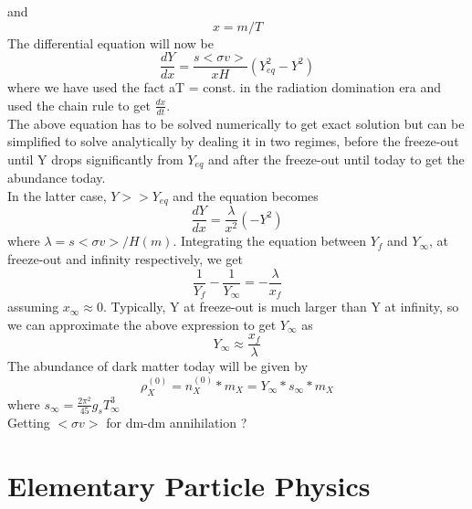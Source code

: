 \documentclass[12pt,a4paper,oneside]{book}
\begin{document}
and 
\begin{equation}
    x = m/T
\end{equation}
The differential equation will now be 
\begin{equation}
    \frac{dY}{dx} = \frac{s<\sigma v>}{xH}(Y_{eq}^2 - Y^2)
\end{equation}
where we have used the fact aT = const. in the radiation domination era and used the chain rule to get $\frac{dx}{dt}$.\\ The above equation has to be solved numerically to get exact solution but can be simplified to solve analytically by dealing it in two regimes, before the freeze-out until Y drops significantly from $Y_{eq}$ and after the freeze-out until today to get the abundance today.\\ In the latter case, $ Y >> Y_{eq}$ and the equation becomes
\begin{equation}
    \frac{dY}{dx}  = \frac{\lambda}{x^2}(- Y^2) 
\end{equation}
where $\lambda = s<\sigma v>/H(m)$. Integrating the equation between $Y_{f}$ and $Y_{\infty}$, at freeze-out and infinity respectively, we get
\begin{equation}
    \frac{1}{Y_{f}} - \frac{1}{Y_{\infty}} = -\frac{\lambda}{x_{f}}
\end{equation}
assuming $x_{\infty} \approx 0$. Typically, Y at freeze-out is much larger than Y at infinity, so we can approximate the above expression to get $Y_{\infty}$ as 
\begin{equation}
    Y_{\infty} \approx \frac{x_{f}}{\lambda}
\end{equation}
The abundance of dark matter today will be given by 
\begin{equation}
    \rho_{X}^{(0)} = n_{X}^{(0)}*m_{X} = Y_{\infty}*s_{\infty}*m_{X}
\end{equation}
where $s_{\infty} = \frac{2\pi^2}{45}g_{s}T_{\infty}^3 $ \\
Getting $<\sigma v>$ for dm-dm annihilation ?
\chapter{Elementary Particle Physics}
\end{document}
